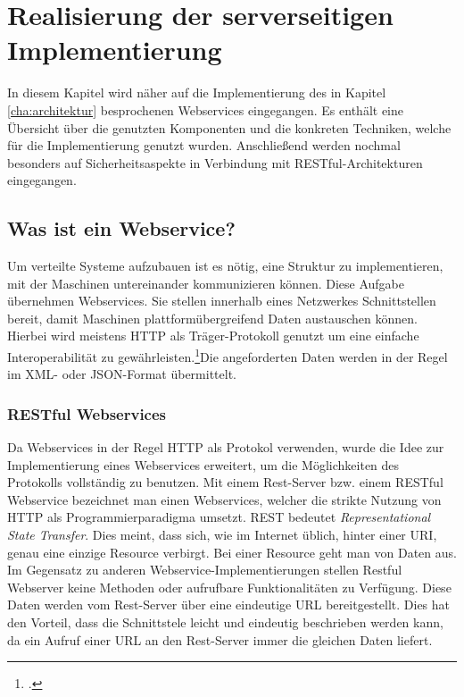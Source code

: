 \chapter{Realisierung der serverseitigen Implementierung}
\label{cha:server-impl}
In diesem Kapitel wird näher auf die Implementierung des in Kapitel \ref{cha:architektur} besprochenen Webservices eingegangen. Es enthält eine Übersicht über die genutzten Komponenten und die konkreten Techniken, welche für die Implementierung genutzt wurden. Anschließend werden nochmal besonders auf Sicherheitsaspekte in Verbindung mit RESTful-Architekturen eingegangen. 

\section{Was ist ein Webservice?}
\label{sec:definition-webservice}
Um verteilte Systeme aufzubauen ist es nötig, eine Struktur zu implementieren, mit der Maschinen untereinander kommunizieren können. Diese Aufgabe übernehmen Webservices. Sie stellen innerhalb eines Netzwerkes Schnittstellen bereit, damit Maschinen plattformübergreifend Daten austauschen können. Hierbei wird meistens HTTP als Träger-Protokoll genutzt um eine einfache Interoperabilität zu gewährleisten.\footcite{Definition-Webservice}Die angeforderten Daten werden in der Regel im XML- oder JSON-Format übermittelt. 

\subsection{RESTful Webservices}
\label{sec:definition-rest}
Da Webservices in der Regel \ac{HTTP} als Protokol verwenden, wurde die Idee zur Implementierung eines Webservices erweitert, um die Möglichkeiten des Protokolls vollständig zu benutzen. Mit einem Rest-Server bzw. einem RESTful Webservice bezeichnet man einen Webservices, welcher die strikte Nutzung von HTTP als Programmierparadigma umsetzt. REST bedeutet \textit{Representational State Transfer}. Dies meint, dass sich, wie im Internet üblich, hinter einer \ac{URI}, genau eine einzige Resource verbirgt. Bei einer Resource geht man von Daten aus. Im Gegensatz zu anderen Webservice-Implementierungen stellen Restful Webserver keine Methoden oder aufrufbare Funktionalitäten zu Verfügung. Diese Daten werden vom Rest-Server über eine eindeutige URL bereitgestellt. Dies hat den Vorteil, dass die Schnittstele leicht und eindeutig beschrieben werden kann, da ein Aufruf einer URL an den Rest-Server immer die gleichen Daten liefert. 

